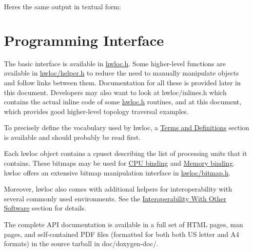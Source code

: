 Here\textquotesingle{}s the same output in textual form\+:



 \hypertarget{a00379_interface}{}\section{Programming Interface}\label{a00379_interface}
The basic interface is available in \hyperlink{a00119_source}{hwloc.\+h}. Some higher-\/level functions are available in \hyperlink{a00122_source}{hwloc/helper.\+h} to reduce the need to manually manipulate objects and follow links between them. Documentation for all these is provided later in this document. Developers may also want to look at hwloc/inlines.\+h which contains the actual inline code of some \hyperlink{a00119_source}{hwloc.\+h} routines, and at this document, which provides good higher-\/level topology traversal examples.

To precisely define the vocabulary used by hwloc, a \hyperlink{a00380}{Terms and Definitions} section is available and should probably be read first.

Each hwloc object contains a cpuset describing the list of processing units that it contains. These bitmaps may be used for \hyperlink{a00190}{C\+PU binding} and \hyperlink{a00191}{Memory binding}. hwloc offers an extensive bitmap manipulation interface in \hyperlink{a00125_source}{hwloc/bitmap.\+h}.

Moreover, hwloc also comes with additional helpers for interoperability with several commonly used environments. See the \hyperlink{a00390}{Interoperability With Other Software} section for details.

The complete A\+PI documentation is available in a full set of H\+T\+ML pages, man pages, and self-\/contained P\+DF files (formatted for both both US letter and A4 formats) in the source tarball in doc/doxygen-\/doc/.


